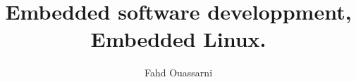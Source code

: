 \documentclass[a4paper]{article}
\begin{document}

\author{Fahd Ouassarni}
\title{Embedded software developpment,\\ Embedded Linux.}

\address{6 Boulevard Mar\'echal Juin\\
		 14000 CAEN}

\maketitle

\end{document}
